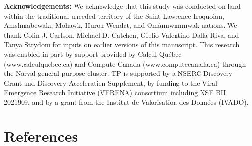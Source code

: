 \documentclass[11pt]{article}
\begin{document}
\textbf{Acknowledgements:} We acknowledge that this study was conducted
on land within the traditional unceded territory of the Saint Lawrence
Iroquoian, Anishinabewaki, Mohawk, Huron-Wendat, and Omàmiwininiwak
nations. We thank Colin J. Carlson, Michael D. Catchen, Giulio Valentino
Dalla Riva, and Tanya Strydom for inputs on earlier versions of this
manuscript. This research was enabled in part by support provided by
Calcul Québec (www.calculquebec.ca) and Compute Canada
(www.computecanada.ca) through the Narval general purpose cluster. TP is
supported by a NSERC Discovery Grant and Discovery Acceleration
Supplement, by funding to the Viral Emergence Research Initiative
(VERENA) consortium including NSF BII 2021909, and by a grant from the
Institut de Valorisation des Données (IVADO).

\hypertarget{references}{%
\section*{References}\label{references}}
\end{document}
